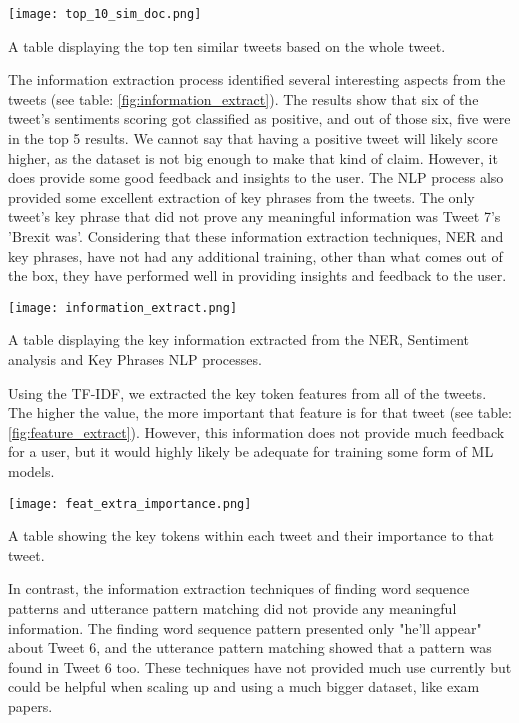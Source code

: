 	\begin{table}[h]
		\centering
		\texttt{[image: top\_10\_sim\_doc.png]}
		\caption{A table displaying the top ten similar tweets based on the whole tweet.}
		\label{fig:top_10_sim_doc}
		
	\end{table}

	The information extraction process identified several interesting aspects from the tweets (see table: \ref{fig:information_extract}). The results show that six of the tweet's sentiments scoring got classified as positive, and out of those six, five were in the top 5 results. We cannot say that having a positive tweet will likely score higher, as the dataset is not big enough to make that kind of claim. However, it does provide some good feedback and insights to the user. The NLP process also provided some excellent extraction of key phrases from the tweets. The only tweet's key phrase that did not prove any meaningful information was Tweet 7's 'Brexit was'. Considering that these information extraction techniques, NER and key phrases, have not had any additional training, other than what comes out of the box, they have performed well in providing insights and feedback to the user.


	\begin{table}[h]
		\centering
		\texttt{[image: information\_extract.png]}
		\caption{A table displaying the key information extracted from the NER, Sentiment analysis and Key Phrases NLP processes.}
		\label{fig:information_extract}
		
	\end{table}

	Using the TF-IDF, we extracted the key token features from all of the tweets. The higher the value, the more important that feature is for that tweet (see table: \ref{fig:feature_extract}). However, this information does not provide much feedback for a user, but it would highly likely be adequate for training some form of ML models.

	\begin{table}[h]
		\centering
		\texttt{[image: feat\_extra\_importance.png]}
		\caption{A table showing the key tokens within each tweet and their importance to that tweet.}
		\label{fig:feature_extract}
		
	\end{table}

	In contrast, the information extraction techniques of finding word sequence patterns and utterance pattern matching did not provide any meaningful information. The finding word sequence pattern presented only "he'll appear" about Tweet 6, and the utterance pattern matching showed that a pattern was found in Tweet 6 too. These techniques have not provided much use currently but could be helpful when scaling up and using a much bigger dataset, like exam papers.



